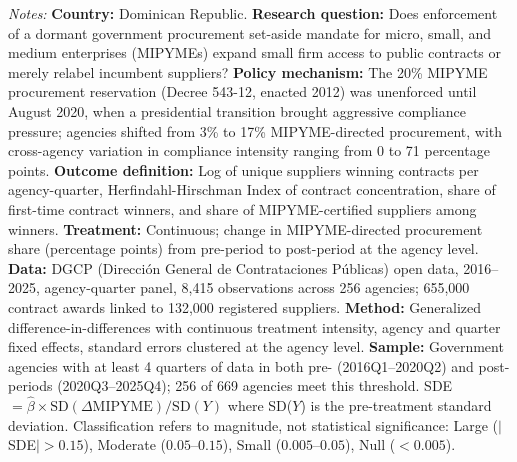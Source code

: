 \begin{table}[t]
\begin{tablenotes}
\item \textit{Notes:} \textbf{Country:} Dominican Republic. \textbf{Research question:} Does enforcement of a dormant government procurement set-aside mandate for micro, small, and medium enterprises (MIPYMEs) expand small firm access to public contracts or merely relabel incumbent suppliers? \textbf{Policy mechanism:} The 20\% MIPYME procurement reservation (Decree 543-12, enacted 2012) was unenforced until August 2020, when a presidential transition brought aggressive compliance pressure; agencies shifted from 3\% to 17\% MIPYME-directed procurement, with cross-agency variation in compliance intensity ranging from 0 to 71 percentage points. \textbf{Outcome definition:} Log of unique suppliers winning contracts per agency-quarter, Herfindahl-Hirschman Index of contract concentration, share of first-time contract winners, and share of MIPYME-certified suppliers among winners. \textbf{Treatment:} Continuous; change in MIPYME-directed procurement share (percentage points) from pre-period to post-period at the agency level. \textbf{Data:} DGCP (Direcci\'on General de Contrataciones P\'ublicas) open data, 2016--2025, agency-quarter panel, 8,415 observations across 256 agencies; 655,000 contract awards linked to 132,000 registered suppliers. \textbf{Method:} Generalized difference-in-differences with continuous treatment intensity, agency and quarter fixed effects, standard errors clustered at the agency level. \textbf{Sample:} Government agencies with at least 4 quarters of data in both pre- (2016Q1--2020Q2) and post-periods (2020Q3--2025Q4); 256 of 669 agencies meet this threshold. SDE $= \hat{\beta} \times \text{SD}(\Delta\text{MIPYME}) / \text{SD}(Y)$ where SD($Y$) is the pre-treatment standard deviation. Classification refers to magnitude, not statistical significance: Large ($|$SDE$| > 0.15$), Moderate ($0.05$--$0.15$), Small ($0.005$--$0.05$), Null ($< 0.005$).
\end{tablenotes}
\end{table}

